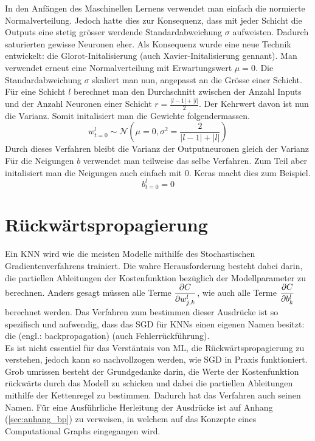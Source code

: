 In den Anfängen des Maschinellen Lernens verwendet man einfach die normierte
Normalverteilung. Jedoch hatte dies zur Konsequenz, dass mit jeder Schicht die
Outputs eine stetig grösser werdende Standardabweichung $\sigma$ aufweisten.
Dadurch saturierten gewisse Neuronen eher.
\para{}
Als Konsequenz wurde eine neue Technik entwickelt: die Glorot-Initalisierung
(auch Xavier-Initalisierung gennant). Man verwendet erneut eine Normalverteilung
mit Erwartungswert $\mu = 0$. Die Standardabweichung $\sigma$ skaliert man nun, angepasst
an die Grösse einer Schicht.
Für eine Schicht $l$ berechnet man den Durchschnitt zwischen der Anzahl Inputs
und der Anzahl Neuronen einer Schicht $r = \frac{|l-1| + |l|}{2}$. Der Kehrwert
davon ist nun die Varianz.
Somit initalisiert man die Gewichte folgendermassen.
\begin{equation}
  w_{t=0}^l \sim \mathcal{N}\left(\mu = 0, \sigma^2 = \frac{2}{|l-1| + |l|}\right)
\end{equation}
Durch dieses Verfahren bleibt die Varianz der Outputneuronen gleich der Varianz
Für die Neigungen $b$ verwendet man teilweise das selbe Verfahren. Zum Teil aber
initalisiert man die Neigungen auch einfach mit 0. Keras macht dies zum Beispiel.
\begin{equation}
  b_{t=0}^l = 0
\end{equation}

\para{}
\cite{wiki:normal_distribution}
\cite{Nielsen}
\cite{book:hands-on}

\section{Rückwärtspropagierung}\label{sec:backpropagation}
Ein KNN wird wie die meisten Modelle mithilfe des Stochastischen
Gradientenverfahrens trainiert.
Die wahre Herausforderung besteht dabei darin, die partiellen Ableitungen der
Kostenfunktion bezüglich der Modellparameter zu berechnen.
Anders gesagt müssen alle Terme
$\displaystyle\frac{\partial C}{\partial w_{j,k}^l}$, wie auch alle Terme $\displaystyle\frac{\partial C}{\partial b_k^l}$
berechnet werden.
Das Verfahren zum bestimmen dieser Ausdrücke ist so spezifisch und aufwendig,
dass das SGD für KNNs einen eigenen Namen besitzt: die
 (engl.: backpropagation) (auch
Fehlerrückführung). \\
Es ist nicht essentiel für das Verstäntnis von ML, die Rückwärtspropagierung zu
verstehen, jedoch kann so nachvollzogen werden, wie SGD in Praxis funktioniert.
\para{}
Grob umrissen besteht der Grundgedanke darin, die Werte der Kostenfunktion
rückwärts durch das Modell zu schicken und dabei die partiellen Ableitungen
mithilfe der Kettenregel zu bestimmen. Dadurch hat das Verfahren auch seinen Namen.
\para{}
Für eine Ausführliche Herleitung der Ausdrücke ist auf Anhang
(\ref{sec:anhang_bp}) zu verweisen, in welchem auf das Konzepte eines
Computational Graphs eingegangen wird.

